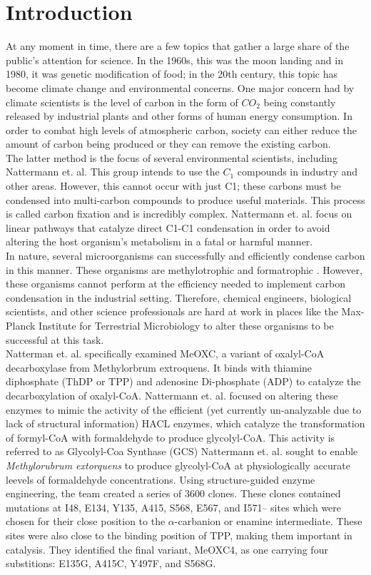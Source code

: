 \documentclass[12pt]{extarticle}
\begin{document}
\section{Introduction}
At any moment in time, there are a few topics that gather a large share of the public's attention for science. In the 1960s, this was the moon landing and in 1980, it was genetic modification of food; in the 20th century, this topic has become climate change and environmental concerns. One major concern had by climate scientists is the level of carbon in the form of $CO_2$ being constantly released by industrial plants and other forms of human energy consumption. In order to combat high levels of atmospheric carbon, society can either reduce the amount of carbon being produced or they can remove the existing carbon. \\\indent The latter method is the focus of several environmental scientists, including Nattermann et. al. This group intends to use the $C_1$ compounds in industry and other areas. However, this cannot occur with just C1; these carbons must be condensed into multi-carbon compounds to produce useful materials. This process is called carbon fixation and is incredibly complex. Nattermann et. al. focus on linear pathways that catalyze direct C1-C1 condensation in order to avoid altering the host organism's metabolism in a fatal or harmful manner.\\
\indent In nature, several microorganisms can successfully and efficiently condense carbon in this manner. These organisms are methylotrophic and formatrophic \cite{Nattermann}. However, these organisms cannot perform at the efficiency needed to implement carbon condensation in the industrial setting. Therefore, chemical engineers, biological scientists, and other science professionals are hard at work in places like the Max-Planck Institute for Terrestrial Microbiology to alter these organisms to be successful at this task. \\\indent Natterman et. al. specifically examined MeOXC, a variant of oxalyl-CoA decarboxylase from Methylorbrum extroquens. It binds with thiamine diphosphate (ThDP or TPP) and adenosine Di-phosphate (ADP) to catalyze the decarboxylation of oxalyl-CoA. Nattermann et. al. focused on altering these enzymes to mimic the activity of the efficient (yet currently un-analyzable due to lack of structural information) HACL enzymes, which catalyze the transformation of formyl-CoA with formaldehyde to produce glycolyl-CoA. This activity is referred to as Glycolyl-Coa Synthase (GCS) Nattermann et. al. sought to enable \textit{Methylorubrum extorquens} to produce glycolyl-CoA at physiologically accurate leevels of formaldehyde concentrations. Using structure-guided enzyme engineering, the team created a series of 3600 clones. These clones contained mutations at I48, E134, Y135, A415, S568, E567, and I571-- sites which were chosen for their close position to the $\alpha$-carbanion or enamine intermediate. These sites were also close to the binding position of TPP, making them important in catalysis. They identified the final variant, MeOXC4, as one carrying four substitions: E135G, A415C, Y497F, and S568G.\\
\end{document}
